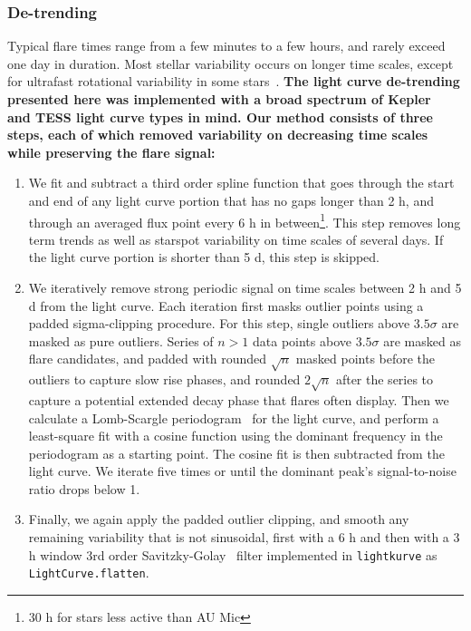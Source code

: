 \documentclass[fleqn,usenatbib]{mnras}%
\begin{document}
\subsubsection{De-trending}
\label{sec:detrend}
Typical flare times range from a few minutes to a few hours, and rarely exceed one day in duration. Most stellar variability occurs on longer time scales, except for ultrafast rotational variability in some stars~\citep{ilin2021giant}. \textbf{The light curve de-trending presented here was implemented with a broad spectrum of Kepler~\citep{borucki2010} and TESS light curve types in mind. Our method consists of three steps, each of which removed variability on decreasing time scales while preserving the flare signal:}  %

\begin{enumerate}
\item We fit and subtract a third order spline function that goes through the start and end of any light curve portion that has no gaps longer than 2 h, and through an averaged flux point every 6 h in between\footnote{30 h for stars less active than AU Mic}. This step removes long term trends as well as starspot variability on time scales of several days. If the light curve portion is shorter than 5 d, this step is skipped.
\item We iteratively remove strong periodic signal on time scales between 2 h and 5 d from the light curve. Each iteration first masks outlier points using a padded sigma-clipping procedure. For this step, single outliers above $3.5\sigma$ are masked as pure outliers. Series of $n>1$ data points above $3.5\sigma$ are masked as flare candidates, and padded with rounded $\sqrt{n}$ masked points before the outliers to capture slow rise phases, and rounded $2\sqrt{n}$ after the series to capture a potential extended decay phase that flares often display. Then we calculate a Lomb-Scargle periodogram~\citep{lomb1976,scargle1982} for the light curve, and perform a least-square fit with a cosine function using the dominant frequency in the periodogram as a starting point. The cosine fit is then subtracted from the light curve. We iterate five times or until the dominant peak's signal-to-noise ratio drops below 1.
\item Finally, we again apply the padded outlier clipping, and smooth any remaining variability that is not sinusoidal, first with a 6 h and then with a 3 h window 3rd order Savitzky-Golay~\citep{savitzky1964} filter implemented in \texttt{lightkurve} as \texttt{LightCurve.flatten}.
\end{enumerate}
\end{document}
